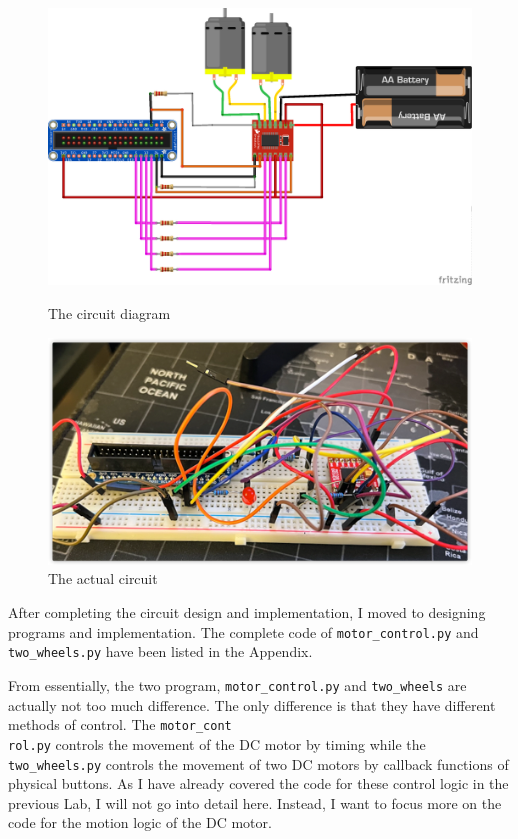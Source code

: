 \documentclass[12pt]{report}
\newcommand{\code}[1]{\colorbox{light-gray}{\texttt{#1}}}
\begin{document}
\begin{figure}[H]
\centering
\begin{minipage}[t]{0.48\textwidth}
\centering
\includegraphics[width=\textwidth]{img/CircuirDiagram.png}
\caption{The circuit diagram}
\label{fig:fig2}
\end{minipage}
\begin{minipage}[t]{0.48\textwidth}
\centering
\includegraphics[width=\textwidth]{img/Circuit.png}
\caption{The actual circuit}
\label{fig:fig3}
\end{minipage}
\end{figure}
After completing the circuit design and implementation, I moved to designing programs and implementation. The complete code of \code{motor\_control.py} and \code{two\_wheels.py} have been listed in the Appendix.\par 
From essentially, the two program, \code{motor\_control.py} and \code{two\_wheels} are actually not too much difference. The only difference is that they have different methods of control. The \code{motor\_cont}\\\code{rol.py} controls the movement of the DC motor by timing while the \code{two\_wheels.py} controls the movement of two DC motors by callback functions of physical buttons. As I have already covered the code for these control logic in the previous Lab, I will not go into detail here. Instead, I want to focus more on the code for the motion logic of the DC motor. \par
\end{document}
